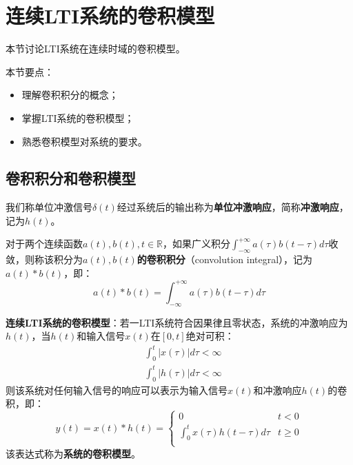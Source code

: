 \section{连续LTI系统的卷积模型}

本节讨论LTI系统在连续时域的卷积模型。

本节要点：
\begin{itemize}
    \item 理解卷积积分的概念；
    \item 掌握LTI系统的卷积模型；
    \item 熟悉卷积模型对系统的要求。
\end{itemize}

\subsection{卷积积分和卷积模型}

\begin{definition}[冲激响应]
我们称单位冲激信号$\delta \left( t \right) $经过系统后的输出称为{\bf 单位冲激响应}，简称{\bf 冲激响应}，记为$h\left( t \right) $。
\end{definition}

\begin{definition}[卷积积分]
对于两个连续函数$a\left( t \right) ,b\left( t \right) ,t\in \mathbb{R} $，如果广义积分$\int_{-\infty}^{+\infty}{a\left( \tau \right) b\left( t-\tau \right) d\tau}$收敛，则称该积分为{\bf $a\left( t \right) ,b\left( t \right) $的卷积积分}（convolution integral），记为$a\left( t \right) \ast b\left( t \right) $，即：
\[
a\left( t \right) \ast b\left( t \right) =\int_{-\infty}^{+\infty}{a\left( \tau \right) b\left( t-\tau \right) d\tau}
\]
\end{definition}

{\bf 连续LTI系统的卷积模型}：若一LTI系统符合因果律且零状态，系统的冲激响应为$h\left( t \right) $，当$h\left( t \right) $和输入信号$x\left( t \right) $在$\left[ 0,t \right] $绝对可积：
\begin{align*}
&\int_0^t{\left| x\left( \tau \right) \right|d\tau}<\infty \\
&\int_0^t{\left| h\left( \tau \right) \right|d\tau}<\infty
\end{align*}
则该系统对任何输入信号的响应可以表示为输入信号$x\left( t \right) $和冲激响应$h\left( t \right) $的卷积，即：
\[
y\left( t \right) =x\left( t \right) \ast h\left( t \right) =\begin{cases}
	0 &t<0\\
	\int_0^t{x\left( \tau \right) h\left( t-\tau \right) d\tau} &t\geqslant 0\\
\end{cases}
\]
该表达式称为{\bf 系统的卷积模型}。

